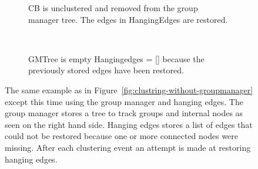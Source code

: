 \begin{figure}[h]
  \begin{subfigure}[t]{0.5\textwidth}
    \centering
    \renewcommand\thesubfigure{E1}
    \caption{CB is unclustered and removed from the group manager tree. The edges in HangingEdges are restored.}
  \end{subfigure}
  ~
  \begin{subfigure}[t]{0.5\textwidth}
    \centering
    \renewcommand\thesubfigure{E2}
    \caption{GMTree is empty Hangingedges = [] because the previously stored edges have been restored.}
  \end{subfigure}
  \caption{The same example as in Figure~\ref{fig:clustring-without-groupmanager} except this time using the group manager and hanging edges. The group manager stores a tree to track groups and internal nodes as seen on the right hand side. Hanging edges stores a list of edges that could not be restored because one or more connected nodes were missing. After each clustering event an attempt is made at restoring hanging edges.}
	\label{fig:clustring-with-groupmanager}
\end{figure}

\restoregeometry %
